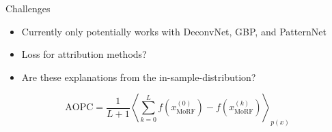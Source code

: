 \begin{frame}{Challenges}
	\begin{itemize}
		\item Currently only potentially works with DeconvNet, GBP, and PatternNet
		\item Loss for attribution methods?
		\item Are these explanations from the in-sample-distribution?
	\end{itemize}

	$$
		\mathrm{AOPC}=\frac{1}{L+1}\left\langle\sum_{k=0}^{L} f\left(x_{\mathrm{MoRF}}^{(0)}\right)-f\left(x_{\mathrm{MoRF}}^{(k)}\right)\right\rangle_{p(x)}
	$$
\end{frame}
